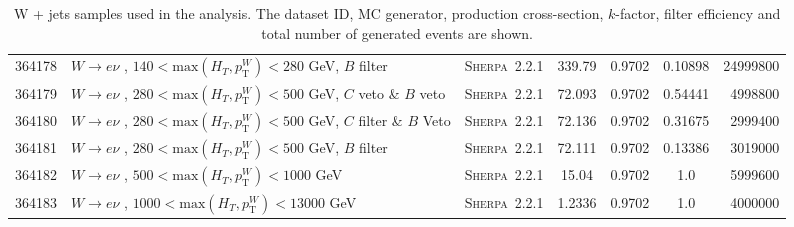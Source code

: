 \begin{table}[!htb]
{\begin{tabular}{|c|l|c|c|c|c|r|}
      364178 & $W \to e\nu $ , $140<\text{max}(H_T,p_{\text{T}}^W)<280$ GeV, $B$ filter & \textsc{Sherpa}~2.2.1 &               339.79         & 0.9702& 0.10898 &  24999800\\
      364179 & $W \to e\nu $ , $280<\text{max}(H_T,p_{\text{T}}^W)<500$ GeV, $C$ veto \& $B$ veto & \textsc{Sherpa}~2.2.1 &     72.093         & 0.9702& 0.54441 &  4998800 \\
      364180 & $W \to e\nu $ , $280<\text{max}(H_T,p_{\text{T}}^W)<500$ GeV,  $C$ filter \& $B$ Veto & \textsc{Sherpa}~2.2.1 &  72.136         & 0.9702& 0.31675 &  2999400 \\
      364181 & $W \to e\nu $ , $280<\text{max}(H_T,p_{\text{T}}^W)<500$ GeV, $B$ filter & \textsc{Sherpa}~2.2.1 &               72.111         & 0.9702& 0.13386 &  3019000 \\
      364182 & $W \to e\nu $ , $500<\text{max}(H_T,p_{\text{T}}^W)<1000$ GeV                      & \textsc{Sherpa}~2.2.1 &     15.04          & 0.9702& 1.0 	&  5999600 \\
      364183 & $W \to e\nu $ , $1000<\text{max}(H_T,p_{\text{T}}^W)<13000$ GeV                    & \textsc{Sherpa}~2.2.1 &     1.2336         & 0.9702& 1.0 	&  4000000 \\
      \hline
      \hline
    \end{tabular}
    \caption{W + jets samples used in the analysis. The dataset ID, MC generator,
      production cross-section, $k$-factor, filter efficiency and total number of
      generated events are shown.}
    \label{tabular:mc_samples_Wjets}
  }
\end{table}